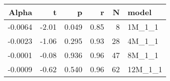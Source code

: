 \begin{table}[ht]
\centering
\begin{tabular}{rrrrrl}
  \hline
Alpha & t & p & r & N & model \\ 
  \hline
-0.0064 & -2.01 & 0.049 & 0.85 & 8 & 1M\_1\_1 \\ 
  -0.0023 & -1.06 & 0.295 & 0.93 & 28 & 4M\_1\_1 \\ 
  -0.0001 & -0.08 & 0.936 & 0.96 & 47 & 8M\_1\_1 \\ 
  -0.0009 & -0.62 & 0.540 & 0.96 & 62 & 12M\_1\_1 \\ 
   \hline
\end{tabular}
\end{table}

